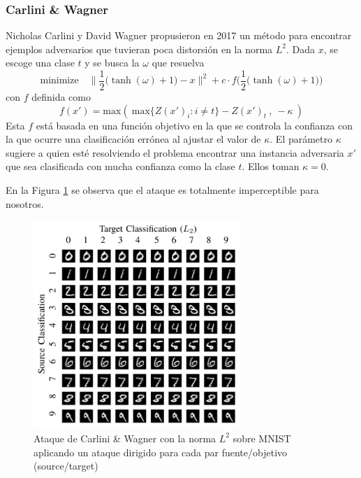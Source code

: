 \subsubsection{Carlini \& Wagner}
Nicholas Carlini y David Wagner \cite{carlini2017evaluating} propusieron en 2017 un método para encontrar ejemplos adversarios que tuvieran poca distorsión en la norma $L^2$. Dada $x$, se escoge una clase $t$ y se busca la $\omega$ que resuelva
\begin{equation*}
    \text{minimize} \quad \Big\lVert \dfrac{1}{2}\big(\tanh(\omega) + 1\big) - x \Big\rVert^2 + c\cdot f\bigg(\dfrac{1}{2}\big(\tanh(\omega) + 1\big)\bigg)
\end{equation*}
con $f$ definida como
\begin{equation*}
    f(x') = \text{max}(\ \text{max}\{Z(x')_i : i\neq t\} - Z(x')_t\ ,\ -\kappa\ )
\end{equation*}
Esta $f$ está basada en una función objetivo en la que se controla la confianza con la que ocurre una clasificación errónea al ajustar el valor de $\kappa$. El parámetro $\kappa$ sugiere a quien esté resolviendo el problema encontrar una instancia adversaria $x'$ que sea clasificada con mucha confianza como la clase $t$. Ellos toman $\kappa = 0$.

En la Figura \ref{CW} se observa que el ataque es totalmente imperceptible para nosotros.

\begin{figure}[h!]
    \centering
    \includegraphics[width=0.7\textwidth]{images/CW/CW_L2.png}
    \caption{Ataque de Carlini \& Wagner con la norma $L^2$ sobre MNIST aplicando un ataque dirigido para cada par fuente/objetivo (source/target)}
    \label{CW}
\end{figure}

